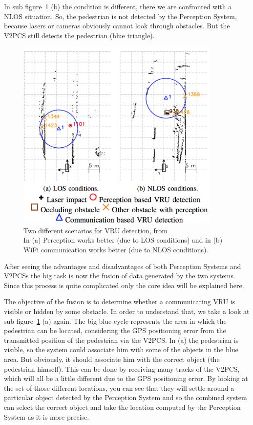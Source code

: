 \documentclass[]{ccs-thesis}
\begin{document}
In sub figure~\ref{fig:fusion} (b) the condition is different, there we are confronted with a \ac{NLOS} situation. So, the pedestrian is not detected by the Perception System, because lasers or cameras obviously cannot look through obstacles. But the \ac{V2PCS} still detects the pedestrian (blue triangle).

\begin{figure}[h]
	\centering
	\includegraphics[width=0.9\textwidth]{figures/7_fusion}
	\caption{Two different scenarios for \ac{VRU} detection, from \cite{2016fusion}\\ In (a) Perception works better (due to \ac{LOS} conditions) and in (b) WiFi communication works better (due to \ac{NLOS} conditions).}%
	\label{fig:fusion}%
\end{figure}

After seeing the advantages and disadvantages of both Perception Systems and \acp{V2PCS} the big task is now the fusion of data generated by the two systems. Since this process is quite complicated only the core idea will be explained here.

The objective of the fusion is to determine whether a communicating \ac{VRU} is visible or hidden by some obstacle. In order to understand that, we take a look at sub figure~\ref{fig:fusion} (a) again. The big blue cycle represents the area in which the pedestrian can be located, considering the GPS positioning error from the transmitted position of the pedestrian via the \ac{V2PCS}. In (a) the pedestrian is visible, so the system could associate him with some of the objects in the blue area. But obviously, it should associate him with the correct object (the pedestrian himself). This can be done by receiving many tracks of the \ac{V2PCS}, which will all be a little different due to the GPS positioning error. By looking at the set of those different locations, you can see that they will settle around a particular object detected by the Perception System and so the combined system can select the correct object and take the location computed by the Perception System as it is more precise.
\end{document}
